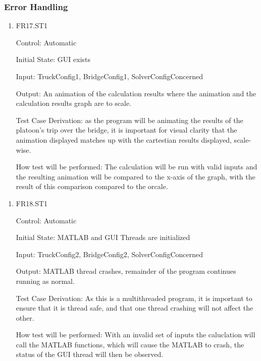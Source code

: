 \documentclass[12pt, titlepage]{article}
\begin{document}
\subsubsection{Error Handling}
\begin{enumerate}

  \item{FR17.ST1\\}
  
  Control: Automatic
            
  Initial State: GUI exists
            
  Input: TruckConfig1, BridgeConfig1, SolverConfigConcerned
            
  Output: An animation of the calculation results where the animation and the calculation results graph are to scale.
  
  Test Case Derivation: as the program will be animating the results of the platoon's trip over the bridge, it is important for visual clarity that the animation displayed matches up with the cartestian results displayed, scale-wise.
  
  How test will be performed: The calculation will be run with valid inputs and the resulting animation will be compared to the x-axis of the graph, with the result of this comparison compared to the orcale.
\end{enumerate}
\begin{enumerate}
  \item{FR18.ST1\\}
  
  Control: Automatic
            
  Initial State: MATLAB and GUI Threads are initialized
            
  Input: TruckConfig2, BridgeConfig2, SolverConfigConcerned
            
  Output: MATLAB thread crashes, remainder of the program continues running as normal. 
  
  Test Case Derivation: As this is a multithreaded program, it is important to ensure that it is thread safe, and that one thread crashing will not affect the other.
  
  How test will be performed: With an invalid set of inputs the caluclation will call the MATLAB functions, which will cause the MATLAB to crash, the status of the GUI thread will then be observed.
              
\end{enumerate}
\end{document}
